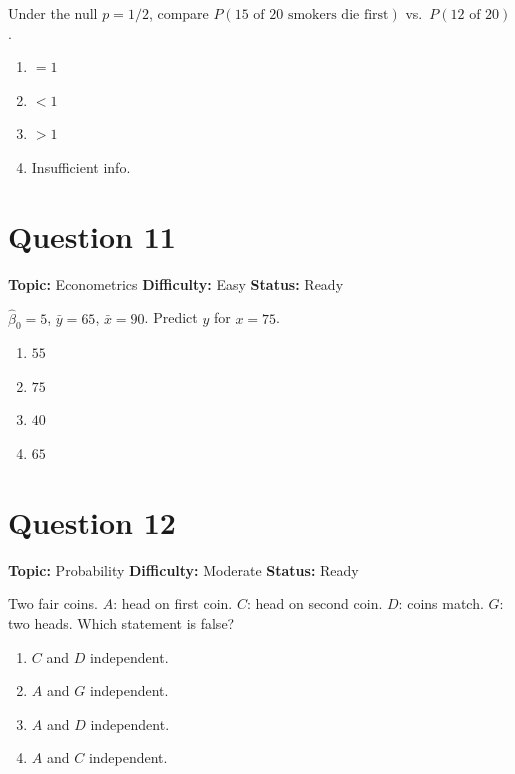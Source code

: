 \documentclass[11pt]{article}
\begin{document}
Under the null $p = 1/2$, compare $P(\text{15 of 20 smokers die first})$ vs.\ $P(\text{12 of 20})$.
\begin{enumerate}[label=(\Alph*)]
\item $=1$ \item $<1$ \item $>1$ \item Insufficient info.
\end{enumerate}

\newpage

\section*{Question 11}


\noindent\textbf{Topic:} Econometrics \quad \textbf{Difficulty:} Easy \quad \textbf{Status:} Ready



$\hat\beta_0 = 5$, $\bar y = 65$, $\bar x = 90$. Predict $y$ for $x = 75$.
\begin{enumerate}[label=(\Alph*)]
\item $55$ \item $75$ \item $40$ \item $65$
\end{enumerate}

\newpage

\section*{Question 12}


\noindent\textbf{Topic:} Probability \quad \textbf{Difficulty:} Moderate \quad \textbf{Status:} Ready



Two fair coins. $A$: head on first coin. $C$: head on second coin. $D$: coins match. $G$: two heads. Which statement is false?
\begin{enumerate}[label=(\Alph*)]
\item $C$ and $D$ independent.
\item $A$ and $G$ independent.
\item $A$ and $D$ independent.
\item $A$ and $C$ independent.
\end{enumerate}
\end{document}
